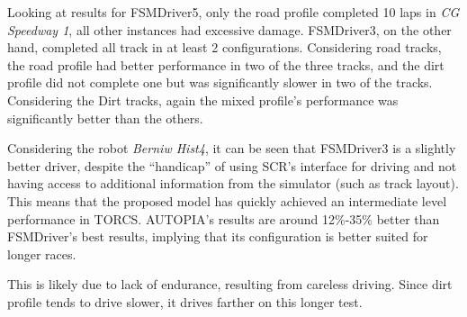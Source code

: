 Looking at results for FSMDriver5, only the road profile completed 10 laps in \emph{CG Speedway 1}, all other instances had excessive damage. FSMDriver3, on the other hand, completed all track in at least 2 configurations. Considering road tracks, the road profile had better performance in two of the three tracks, and the dirt profile did not complete one but was significantly slower in two of the tracks. Considering the Dirt tracks, again the mixed profile's performance was significantly better than the others.

Considering the robot \emph{Berniw Hist4}, it can be seen that FSMDriver3 is a slightly better driver, despite the ``handicap'' of using SCR's interface for driving and not having access to additional information from the simulator (such as track layout). This means that the proposed model has quickly achieved an intermediate level performance in TORCS. AUTOPIA's results are around 12\%-35\% better than FSMDriver's best results, implying that its configuration is better suited for longer races.

This is likely due to lack of endurance, resulting from careless driving. Since dirt profile tends to drive slower, it drives farther on this longer test.








